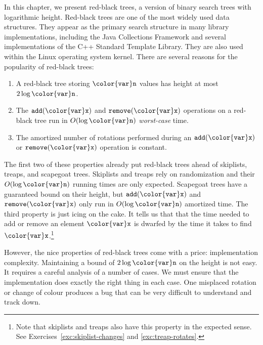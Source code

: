 \documentclass[10pt]{book}
\theoremstyle{plain}
\theoremstyle{definition}
\begin{document}
%
%
In this chapter, we present red-black trees, a version of binary search
trees with logarithmic height.  Red-black trees are one of the most
widely used data structures.  They appear as the primary search structure
in many library implementations, including the Java Collections Framework
and several implementations of the C++ Standard Template Library. They
are also used within the Linux operating system kernel.  There are
several reasons for the popularity of red-black trees:
\begin{enumerate}
\item A red-black tree storing \ensuremath{\mathtt{{\color{var}n}}} values has height at most $2\log \ensuremath{\mathtt{{\color{var}n}}}$.
\item The \ensuremath{\mathtt{add({\color{var}x})}} and \ensuremath{\mathtt{remove({\color{var}x})}} operations on a red-black tree run
   in $O(\log \ensuremath{\mathtt{{\color{var}n}}})$ \emph{worst-case} time.
\item The amortized number of rotations performed during an \ensuremath{\mathtt{add({\color{var}x})}}
   or \ensuremath{\mathtt{remove({\color{var}x})}} operation is constant.
\end{enumerate}
The first two of these properties already put red-black trees 
ahead of skiplists, treaps, and scapegoat trees.
Skiplists and treaps rely on randomization and their $O(\log \ensuremath{\mathtt{{\color{var}n}}})$
running times are only expected. Scapegoat trees have a guaranteed
bound on their height, but \ensuremath{\mathtt{add({\color{var}x})}} and \ensuremath{\mathtt{remove({\color{var}x})}} only run in $O(\log
\ensuremath{\mathtt{{\color{var}n}}})$ amortized time.  The third property is just icing on the cake. It
tells us that  that the time needed to add or remove an element \ensuremath{\mathtt{{\color{var}x}}} is
dwarfed by the time it takes to find \ensuremath{\mathtt{{\color{var}x}}}.\footnote{Note that skiplists and
treaps also have this property in the expected sense. See
Exercises~\ref{exc:skiplist-changes} and \ref{exc:treap-rotates}.}

However, the nice properties of red-black trees come with a price:
implementation complexity. Maintaining a bound of $2\log \ensuremath{\mathtt{{\color{var}n}}}$ on the
height is not easy. It requires a careful analysis of a number of cases.
We must ensure that the implementation does exactly the right
thing in each case.  One misplaced rotation or change of colour produces
a bug that can be very difficult to understand and track down.
\end{document}
